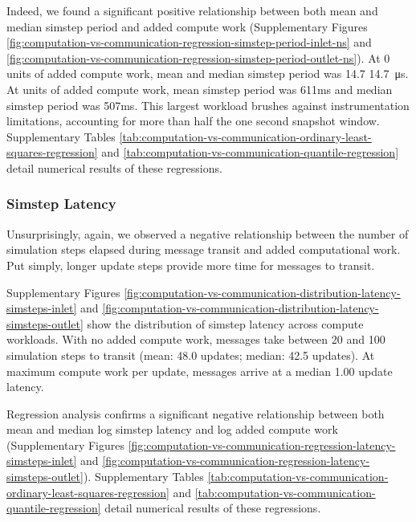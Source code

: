 Indeed, we found a significant positive relationship between both mean and median simstep period and added compute work (Supplementary Figures \ref{fig:computation-vs-communication-regression-simstep-period-inlet-ns} and \ref{fig:computation-vs-communication-regression-simstep-period-outlet-ns}).
At 0 units of added compute work, mean and median simstep period was 14.7 \SI{14.7}{\micro\second}.
At  units of added compute work, mean simstep period was 611ms and median simstep period was 507ms.
This largest workload brushes against instrumentation limitations, accounting for more than half the one second snapshot window.
Supplementary Tables \ref{tab:computation-vs-communication-ordinary-least-squares-regression} and \ref{tab:computation-vs-communication-quantile-regression} detail numerical results of these regressions.

\subsubsection{Simstep Latency}

Unsurprisingly, again, we observed a negative relationship between the number of simulation steps elapsed during message transit and added computational work.
Put simply, longer update steps provide more time for messages to transit.

Supplementary Figures \ref{fig:computation-vs-communication-distribution-latency-simsteps-inlet} and \ref{fig:computation-vs-communication-distribution-latency-simsteps-outlet} show the distribution of simstep latency across compute workloads.
With no added compute work, messages take between 20 and 100 simulation steps to transit (mean: 48.0 updates; median: 42.5 updates).
At maximum compute work per update, messages arrive at a median 1.00 update latency.

Regression analysis confirms a significant negative relationship between both mean and median log simstep latency and log added compute work (Supplementary Figures \ref{fig:computation-vs-communication-regression-latency-simsteps-inlet} and \ref{fig:computation-vs-communication-regression-latency-simsteps-outlet}).
Supplementary Tables \ref{tab:computation-vs-communication-ordinary-least-squares-regression} and \ref{tab:computation-vs-communication-quantile-regression} detail numerical results of these regressions.


